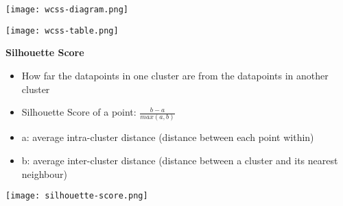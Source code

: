 \begin{minipage}[t]{0.5\linewidth}
    \texttt{[image: wcss-diagram.png]}
\end{minipage}
\begin{minipage}[t]{0.5\linewidth}
    \texttt{[image: wcss-table.png]}
\end{minipage}


\textbf{Silhouette Score}
\begin{itemize}
    \item How far the datapoints in one cluster are from the datapoints in another cluster
    \item Silhouette Score of a point: $\frac{b-a}{max(a,b)}$
    \item a: average intra-cluster distance (distance between each point within)
    \item b: average inter-cluster distance (distance between a cluster and its nearest neighbour)
\end{itemize}
\texttt{[image: silhouette-score.png]}
